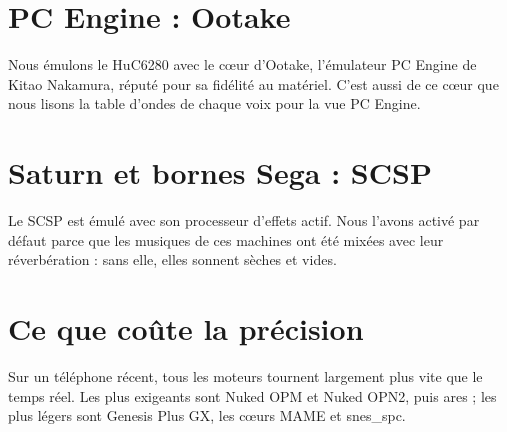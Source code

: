 \section{PC Engine : Ootake}
Nous émulons le HuC6280 avec le cœur d'Ootake, l'émulateur PC Engine de Kitao Nakamura, réputé pour sa fidélité au
matériel. C'est aussi de ce cœur que nous lisons la table d'ondes de chaque voix pour la vue PC Engine.

\section{Saturn et bornes Sega : SCSP}
Le SCSP est émulé avec son processeur d'effets actif. Nous l'avons activé par défaut parce que les musiques de ces
machines ont été mixées avec leur réverbération : sans elle, elles sonnent sèches et vides.

\section{Ce que coûte la précision}
Sur un téléphone récent, tous les moteurs tournent largement plus vite que le temps réel. Les plus exigeants sont
Nuked OPM et Nuked OPN2, puis ares ; les plus légers sont Genesis Plus GX, les cœurs MAME et snes\_spc.
